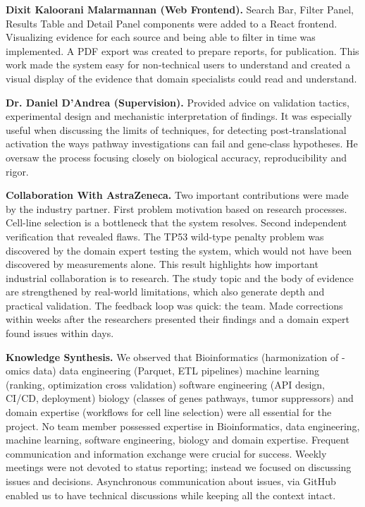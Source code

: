 \documentclass[author={Karen Coutinho, Ishaan Bhalla, Aman Raj, Dixit Kaloorani Malarmannan},
                supervisor={Dr. Daniel D'Andrea},
                degree={MSc},
                title={CellSelector Omics: A Multi-Omics Recommendation System for Cell Line Selection},
                subtitle={},
                type={},
                year={2026}]{dissertation}
\begin{document}
{\bf Dixit Kaloorani Malarmannan (Web Frontend).} Search Bar, Filter Panel, Results Table and Detail Panel components were added to a React frontend. Visualizing evidence for each source and being able to filter in time was implemented. A PDF export was created to prepare reports, for publication. This work made the system easy for non-technical users to understand and created a visual display of the evidence that domain specialists could read and understand.

{\bf Dr. Daniel D'Andrea (Supervision).} Provided advice on validation tactics, experimental design and mechanistic interpretation of findings. It was especially useful when discussing the limits of techniques, for detecting post‑translational activation the ways pathway investigations can fail and gene‑class hypotheses. He oversaw the process focusing closely on biological accuracy, reproducibility and rigor.

{\bf Collaboration With AstraZeneca.} Two important contributions were made by the industry partner. First problem motivation based on research processes. Cell-line selection is a bottleneck that the system resolves. Second independent verification that revealed flaws. The TP53 wild-type penalty problem was discovered by the domain expert testing the system, which would not have been discovered by measurements alone. This result highlights how important industrial collaboration is to research. The study topic and the body of evidence are strengthened by real-world limitations, which also generate depth and practical validation. The feedback loop was quick: the team. Made corrections within weeks after the researchers presented their findings and a domain expert found issues within days.

{\bf Knowledge Synthesis.} We observed that Bioinformatics (harmonization of -omics data) data engineering (Parquet, ETL pipelines) machine learning (ranking, optimization cross validation) software engineering (API design, CI/CD, deployment) biology (classes of genes pathways, tumor suppressors) and domain expertise (workflows for cell line selection) were all essential for the project. No team member possessed expertise in Bioinformatics, data engineering, machine learning, software engineering, biology and domain expertise. Frequent communication and information exchange were crucial for success. Weekly meetings were not devoted to status reporting; instead we focused on discussing issues and decisions. Asynchronous communication about issues, via GitHub enabled us to have technical discussions while keeping all the context intact.
\end{document}
